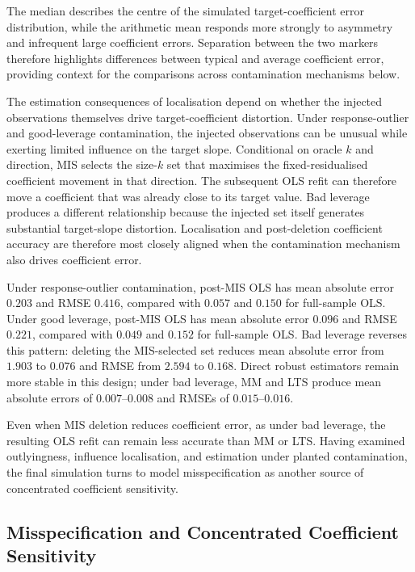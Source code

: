 \documentclass[../main.tex]{subfiles}
\begin{document}
The median describes the centre of the simulated target-coefficient error distribution, while the arithmetic mean responds more strongly to asymmetry and infrequent large coefficient errors. Separation between the two markers therefore highlights differences between typical and average coefficient error, providing context for the comparisons across contamination mechanisms below.

The estimation consequences of localisation depend on whether the injected observations themselves drive target-coefficient distortion. Under response-outlier and good-leverage contamination, the injected observations can be unusual while exerting limited influence on the target slope. Conditional on oracle \(k\) and direction, MIS selects the size-\(k\) set that maximises the fixed-residualised coefficient movement in that direction. The subsequent OLS refit can therefore move a coefficient that was already close to its target value. Bad leverage produces a different relationship because the injected set itself generates substantial target-slope distortion. Localisation and post-deletion coefficient accuracy are therefore most closely aligned when the contamination mechanism also drives coefficient error.

Under response-outlier contamination, post-MIS OLS has mean absolute error \(0.203\) and RMSE \(0.416\), compared with \(0.057\) and \(0.150\) for full-sample OLS. Under good leverage, post-MIS OLS has mean absolute error \(0.096\) and RMSE \(0.221\), compared with \(0.049\) and \(0.152\) for full-sample OLS. Bad leverage reverses this pattern: deleting the MIS-selected set reduces mean absolute error from \(1.903\) to \(0.076\) and RMSE from \(2.594\) to \(0.168\). Direct robust estimators remain more stable in this design; under bad leverage, MM and LTS produce mean absolute errors of \(0.007\)--\(0.008\) and RMSEs of \(0.015\)--\(0.016\).

Even when MIS deletion reduces coefficient error, as under bad leverage, the resulting OLS refit can remain less accurate than MM or LTS. Having examined outlyingness, influence localisation, and estimation under planted contamination, the final simulation turns to model misspecification as another source of concentrated coefficient sensitivity.


\FloatBarrier
\subsection{Misspecification and Concentrated Coefficient Sensitivity}
\label{subsec:misspecification}
\end{document}
